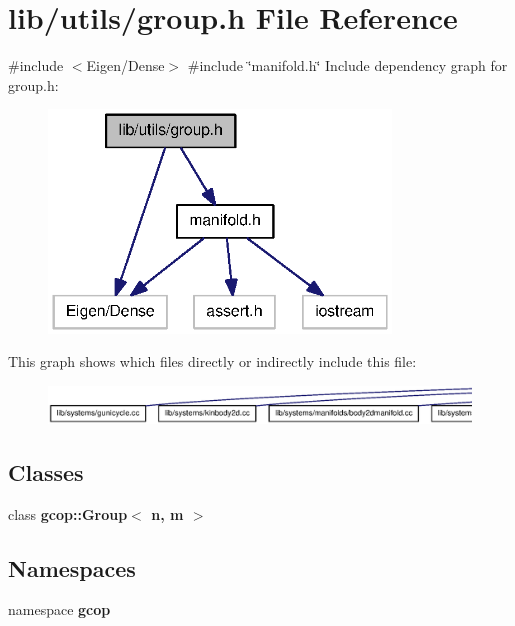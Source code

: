 \section{lib/utils/group.h \-File \-Reference}
\label{group_8h}
{\ttfamily \#include $<$\-Eigen/\-Dense$>$}\*
{\ttfamily \#include \char`\"{}manifold.\-h\char`\"{}}\*
\-Include dependency graph for group.\-h\-:
\nopagebreak
\begin{figure}[H]
\begin{center}
\leavevmode
\includegraphics[width=258pt]{group_8h__incl}
\end{center}
\end{figure}
\-This graph shows which files directly or indirectly include this file\-:
\nopagebreak
\begin{figure}[H]
\begin{center}
\leavevmode
\includegraphics[width=350pt]{group_8h__dep__incl}
\end{center}
\end{figure}
\subsection*{\-Classes}
\begin{DoxyCompactItemize}
\item 
class {\bf gcop\-::\-Group$<$ n, m $>$}
\end{DoxyCompactItemize}
\subsection*{\-Namespaces}
\begin{DoxyCompactItemize}
\item 
namespace {\bf gcop}
\end{DoxyCompactItemize}
